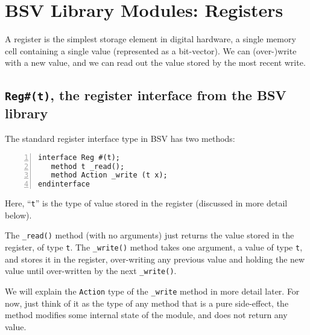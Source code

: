 
\section{BSV Library Modules: Registers}


A register is the simplest storage element in digital hardware, a
single memory cell containing a single value (represented as a
bit-vector).  We can (over-)write with a new value, and we can read
out the value stored by the most recent write.


\subsection{{\tt Reg\#(t)}, the register interface from the BSV library}

\label{Sec_Register_interface}


The standard register interface type in BSV has two methods:

{\small
\begin{Verbatim}[frame=single, numbers=left]
interface Reg #(t);
   method t _read();
   method Action _write (t x);
endinterface
\end{Verbatim}
}

Here, ``\verb|t|'' is the type of value stored in the register
(discussed in more detail below).

The \verb|_read()| method (with no arguments) just returns the value
stored in the register, of type \verb|t|.  The \verb|_write()| method
takes one argument, a value of type \verb|t|, and stores it in the
register, over-writing any previous value and holding the new value
until over-written by the next \verb|_write()|.


We will explain the {\tt Action} type of the {\tt \_write} method in
more detail later.  For now, just think of it as the type of any
method that is a pure side-effect, {\ie} the method modifies some
internal state of the module, and does not return any value.

